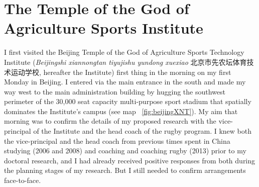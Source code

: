 


\section{The Temple of the God of Agriculture Sports Institute}
I first visited the Beijing Temple of the God of Agriculture Sports Technology Institute (\textit{Beijingshi xiannongtan tiyujishu yundong xuexiao} 北京市先农坛体育技术运动学校,
hereafter the Institute) first thing in the morning on my first Monday in Beijing.  I entered via the main entrance in the south and made my way west to the main administration building by hugging the southwest perimeter of the 30,000 seat capacity multi-purpose sport stadium that spatially dominates the Institute's campus (see map ~\ref{fig:beijingXNT}). My aim that morning was to confirm the details of my proposed research with the vice-principal of the Institute and the head coach of the rugby program. I knew both the vice-principal and the head coach from previous times spent in China studying (2006 and 2008) and coaching and coaching rugby (2013) prior to my doctoral research, and I had already received positive responses from both during the planning stages of my research.  But I still needed to confirm arrangements face-to-face.

